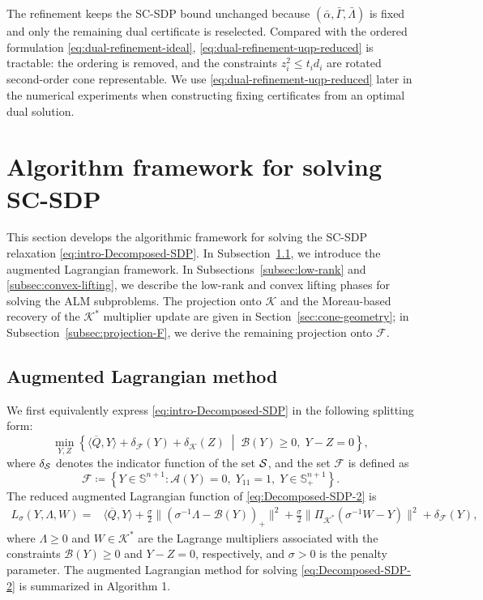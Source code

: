 \documentclass[11pt]{article}
\def\A{\mathcal{A}}
\def\B{\mathcal{B}}
\def\K{\mathcal{K}}
\def\F{\mathcal{F}}
\def\S{\mathbb{S}}
\def\bQ{\overline{Q}}
\theoremstyle{plain}
\begin{document}
The refinement keeps the SC-SDP bound unchanged because $(\bar\alpha,\bar\Gamma,\bar\Lambda)$ is fixed and only the remaining dual certificate is reselected. Compared with the ordered formulation \eqref{eq:dual-refinement-ideal}, \eqref{eq:dual-refinement-uqp-reduced} is tractable: the ordering is removed, and the constraints \(z_i^2\le t_i d_i\) are rotated second-order cone representable. We use \eqref{eq:dual-refinement-uqp-reduced} later in the numerical experiments when constructing fixing certificates from an optimal dual solution.















\section{Algorithm framework for solving SC-SDP}\label{sec:algorithm}

This section develops the algorithmic framework for solving the SC-SDP relaxation \eqref{eq:intro-Decomposed-SDP}. In Subsection~\ref{subsec:alm}, we introduce the augmented Lagrangian framework. In Subsections~\ref{subsec:low-rank} and \ref{subsec:convex-lifting}, we describe the low-rank and convex lifting phases for solving the ALM subproblems. The projection onto $\K$ and the Moreau-based recovery of the $\K^*$ multiplier update are given in Section~\ref{sec:cone-geometry}; in Subsection~\ref{subsec:projection-F}, we derive the remaining projection onto $\F$.

\subsection{Augmented Lagrangian method}\label{subsec:alm}
We first equivalently express \eqref{eq:intro-Decomposed-SDP} in the following splitting form:
\begin{equation}
\label{eq:Decomposed-SDP-2}
\min_{Y,Z}\left\{
\langle \bQ,Y \rangle + \delta_{\F}(Y)+\delta_{\K}(Z)  \;\middle|\;  
 \B(Y)\geq 0,\; Y-Z=0
\right\},
\end{equation}
where $\delta_{\cal S}$ denotes the indicator function of the set ${\cal S}$, and the set $\F$ is defined as
\begin{equation}\label{eq:F-set}
    \F\coloneq\left\{Y\in\S^{n+1} : \A(Y)=0,\; Y_{11}=1,\; Y\in \S^{n+1}_+\right\}.
\end{equation}
The reduced augmented Lagrangian function of \eqref{eq:Decomposed-SDP-2} is
\begin{align}
\label{eq:reduced-AL-Decomposed-SDP}
L_\sigma(Y,\Lambda,W)
=& \langle \bQ,Y \rangle  + \frac{\sigma}{2}
\|(\sigma^{-1}\Lambda- \B(Y) )_+\|^2 + \frac{\sigma}{2}
\|\Pi_{\K^*}(\sigma^{-1}W- Y)\|^2 + \delta_{\F}(Y),
\end{align}
where $\Lambda\geq 0$ and $W\in \K^*$ are the Lagrange multipliers associated with the constraints $\B(Y)\geq 0$ and $Y-Z=0$, respectively, and $\sigma>0$ is the penalty parameter.
The augmented Lagrangian method for solving \eqref{eq:Decomposed-SDP-2} is summarized in Algorithm 1.
\end{document}

